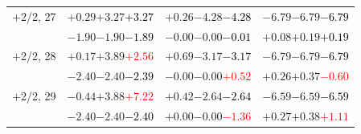 \documentclass[compress]{beamer}
\begin{document}
\begin{frame}
\begin{tabular}{r | c | c | c}
$+$2/2, 27 & $+0.29$\hspace{0.1 cm}$+3.27$\hspace{0.1 cm}\textcolor{black}{$+3.27$} & $+0.26$\hspace{0.1 cm}$-4.28$\hspace{0.1 cm}\textcolor{black}{$-4.28$} & $-6.79$\hspace{0.1 cm}$-6.79$\hspace{0.1 cm}\textcolor{black}{$-6.79$} \\
           & $-1.90$\hspace{0.1 cm}$-1.90$\hspace{0.1 cm}\textcolor{black}{$-1.89$} & $-0.00$\hspace{0.1 cm}$-0.00$\hspace{0.1 cm}\textcolor{black}{$-0.01$} & $+0.08$\hspace{0.1 cm}$+0.19$\hspace{0.1 cm}\textcolor{black}{$+0.19$} \\
$+$2/2, 28 & $+0.17$\hspace{0.1 cm}$+3.89$\hspace{0.1 cm}\textcolor{red}{$+2.56$} & $+0.69$\hspace{0.1 cm}$-3.17$\hspace{0.1 cm}\textcolor{black}{$-3.17$} & $-6.79$\hspace{0.1 cm}$-6.79$\hspace{0.1 cm}\textcolor{black}{$-6.79$} \\
           & $-2.40$\hspace{0.1 cm}$-2.40$\hspace{0.1 cm}\textcolor{black}{$-2.39$} & $-0.00$\hspace{0.1 cm}$-0.00$\hspace{0.1 cm}\textcolor{red}{$+0.52$} & $+0.26$\hspace{0.1 cm}$+0.37$\hspace{0.1 cm}\textcolor{red}{$-0.60$} \\
$+$2/2, 29 & $-0.44$\hspace{0.1 cm}$+3.88$\hspace{0.1 cm}\textcolor{red}{$+7.22$} & $+0.42$\hspace{0.1 cm}$-2.64$\hspace{0.1 cm}\textcolor{black}{$-2.64$} & $-6.59$\hspace{0.1 cm}$-6.59$\hspace{0.1 cm}\textcolor{black}{$-6.59$} \\
           & $-2.40$\hspace{0.1 cm}$-2.40$\hspace{0.1 cm}\textcolor{black}{$-2.40$} & $+0.00$\hspace{0.1 cm}$-0.00$\hspace{0.1 cm}\textcolor{red}{$-1.36$} & $+0.27$\hspace{0.1 cm}$+0.38$\hspace{0.1 cm}\textcolor{red}{$+1.11$} \\

\end{tabular}
\end{frame}
\end{document}
